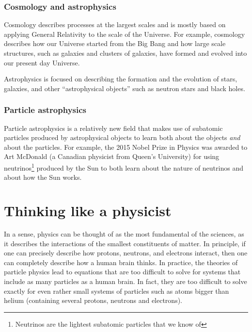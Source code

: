 \subsubsection{Cosmology and astrophysics} 
Cosmology describes processes at the largest scales and is mostly based on applying General Relativity to the scale of the Universe. For example, cosmology describes how our Universe started from the Big Bang and how large scale structures, such as galaxies and clusters of galaxies, have formed and evolved into our present day Universe. 


Astrophysics is focused on describing the formation and the evolution of stars, galaxies, and other ``astrophysical objects'' such as neutron stars and black holes. 

\subsubsection{Particle astrophysics}
Particle astrophysics is a relatively new field that makes use of subatomic particles produced by astrophysical objects to learn both about the objects \textit{and} about the particles. For example, the 2015 Nobel Prize in Physics was awarded to Art McDonald (a Canadian physicist from Queen's University) for using neutrinos\footnote{Neutrinos are the lightest subatomic particles that we know of} produced by the Sun to both learn about the nature of neutrinos and about how the Sun works. 

\section{Thinking like a physicist}
In a sense, physics can be thought of as the most fundamental of the sciences, as it describes the interactions of the smallest constituents of matter. In principle, if one can precisely describe how protons, neutrons, and electrons interact, then one can completely describe how a human brain thinks. In practice, the theories of particle physics lead to equations that are too difficult to solve for systems that include as many particles as a human brain. In fact, they are too difficult to solve exactly for even rather small systems of particles such as atoms bigger than helium (containing several protons, neutrons and electrons). 

